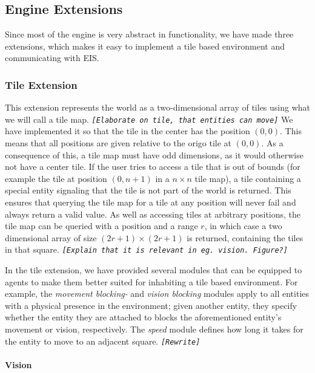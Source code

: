
\subsection{Engine Extensions}

Since most of the engine is very abstract in functionality, we have
made three extensions, which makes it easy to implement a tile based
environment and communicating with EIS.


\subsubsection{Tile Extension}

This extension represents the world as a two-dimensional array of
tiles using what we will call a tile map. \texttt{\emph{{[}Elaborate
on tile, that entities can move{]}}} We have implemented it so that
the tile in the center has the position $(0,0)$. This means that
all positions are given relative to the origo tile at $(0,0)$. As
a consequence of this, a tile map must have odd dimensions, as it
would otherwise not have a center tile. If the user tries to access
a tile that is out of bounds (for example the tile at position $(0,n+1)$
in a $n\times n$ tile map), a tile containing a special entity signaling
that the tile is not part of the world is returned. This ensures that
querying the tile map for a tile at any position will never fail and
always return a valid value. As well as accessing tiles at arbitrary
positions, the tile map can be queried with a position and a range
$r$, in which case a two dimensional array of size $(2r+1)\times(2r+1)$
is returned, containing the tiles in that square. \texttt{\emph{{[}Explain
that it is relevant in eg. vision. Figure?{]}}}

In the tile extension, we have provided several modules that can be
equipped to agents to make them better suited for inhabiting a tile
based environment. For example, the \emph{movement blocking-} and
\emph{vision blocking} modules apply to all entities with a physical
presence in the environment; given another entity, they specify whether
the entity they are attached to blocks the aforementioned entity's
movement or vision, respectively. The \emph{speed} module defines
how long it takes for the entity to move to an adjacent square. \texttt{\emph{{[}Rewrite{]}}}


\paragraph*{Vision}

